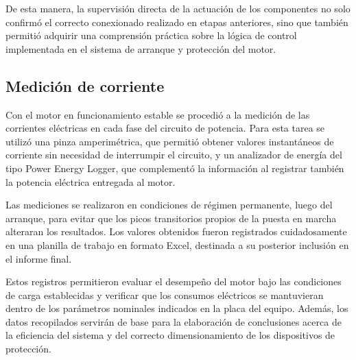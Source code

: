 De esta manera, la supervisión directa de la actuación de los componentes no solo confirmó el correcto conexionado realizado en etapas anteriores, sino que también permitió adquirir una comprensión práctica sobre la lógica de control implementada en el sistema de arranque y protección del motor.

\subsection{Medición de corriente}

Con el motor en funcionamiento estable se procedió a la medición de las corrientes eléctricas en cada fase del circuito de potencia. Para esta tarea se utilizó una pinza amperimétrica, que permitió obtener valores instantáneos de corriente sin necesidad de interrumpir el circuito, y un analizador de energía del tipo Power Energy Logger, que complementó la información al registrar también la potencia eléctrica entregada al motor.  

Las mediciones se realizaron en condiciones de régimen permanente, luego del arranque, para evitar que los picos transitorios propios de la puesta en marcha alteraran los resultados. Los valores obtenidos fueron registrados cuidadosamente en una planilla de trabajo en formato Excel, destinada a su posterior inclusión en el informe final.  

Estos registros permitieron evaluar el desempeño del motor bajo las condiciones de carga establecidas y verificar que los consumos eléctricos se mantuvieran dentro de los parámetros nominales indicados en la placa del equipo. Además, los datos recopilados servirán de base para la elaboración de conclusiones acerca de la eficiencia del sistema y del correcto dimensionamiento de los dispositivos de protección.
